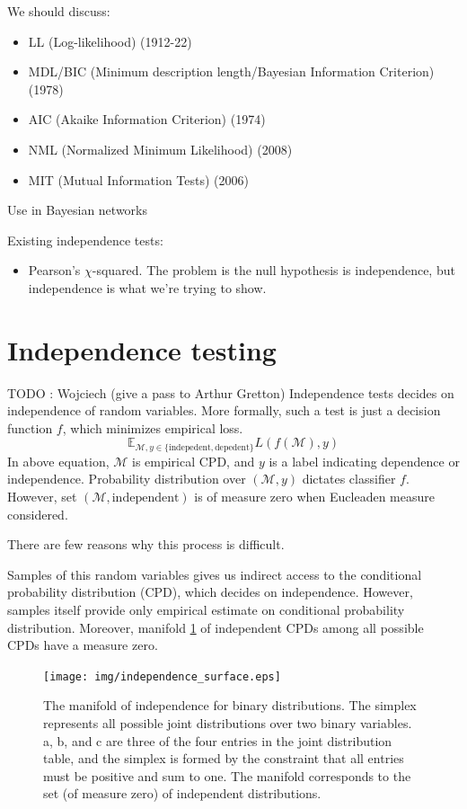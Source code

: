 \documentclass{article} %
\begin{document}
We should discuss:
\begin{itemize}
\item LL (Log-likelihood) (1912-22)
\item MDL/BIC (Minimum description length/Bayesian Information Criterion) (1978)
\item AIC (Akaike Information Criterion) (1974)
\item NML (Normalized Minimum Likelihood) (2008)
\item MIT (Mutual Information Tests) (2006)
\end{itemize}
Use in Bayesian networks \cite{schafer2005empirical}

Existing independence tests:
\begin{itemize}
\item Pearson's $\chi$-squared.  The problem is the null hypothesis is independence, but independence is what we're trying to show.
\end{itemize}

\cite{margaritis2003learning}

\section{Independence testing} TODO : Wojciech (give a pass to Arthur Gretton)
Independence tests decides on independence of random variables. More formally,
such a test is just a decision function $f$, which minimizes empirical loss.
\begin{equation}
  \mathbb{E}_{\mathcal{M}, y \in \{\text{indepedent}, \text{depedent}\}} L(f(\mathcal{M}), y)
\end{equation}
In above equation, $\mathcal{M}$ is empirical CPD, and $y$ is a label 
indicating dependence or independence. Probability distribution over 
$(\mathcal{M}, y)$ dictates classifier $f$. However, 
set $(\mathcal{M}, \text{independent})$ is of measure zero when
Eucleaden measure considered. 




There are few reasons why this process is difficult. 



Samples of this random variables gives us indirect access to the conditional probability
distribution (CPD), which decides on independence. However, samples itself
provide only empirical estimate on conditional probability distribution. 
Moreover, manifold \ref{fig:ind} of independent CPDs among all possible CPDs
have a measure zero. 


\begin{figure}[h]
\centering
\texttt{[image: img/independence\_surface.eps]}
\caption{The manifold of independence for binary distributions. The simplex represents all possible joint distributions over two binary variables.  a, b, and c are three of the four entries in the joint distribution table, and the simplex is formed by the constraint that all entries must be positive and sum to one.  The manifold corresponds to the set (of measure zero) of independent distributions.}
\label{fig:ind}
\end{figure}
\end{document}
